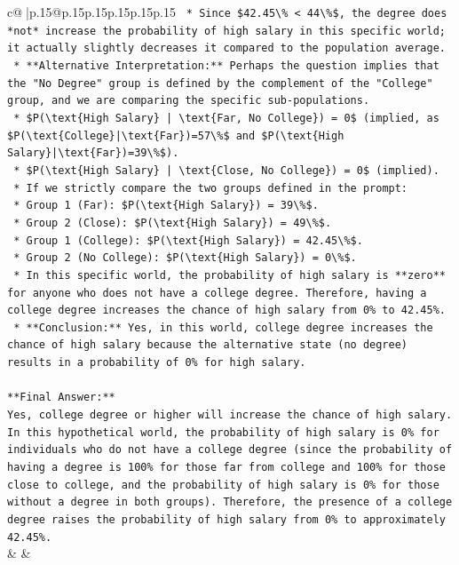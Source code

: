 \documentclass{article}
\begin{document}
{\begin{supertabular}{c@{$\;$}|p{.15\linewidth}@{}p{.15\linewidth}p{.15\linewidth}p{.15\linewidth}p{.15\linewidth}p{.15\linewidth}}
{{{\texttt{    *   Since \$42.45\textbackslash{}\% < 44\textbackslash{}\%\$, the degree does *not* increase the probability of high salary in this specific world; it actually slightly decreases it compared to the population average.} \\
\texttt{    *   **Alternative Interpretation:** Perhaps the question implies that the "No Degree" group is defined by the complement of the "College" group, and we are comparing the specific sub{-}populations.} \\
\texttt{        *   \$P(\textbackslash{}text\{High Salary\} | \textbackslash{}text\{Far, No College\}) = 0\$ (implied, as \$P(\textbackslash{}text\{College\}|\textbackslash{}text\{Far\})=57\textbackslash{}\%\$ and \$P(\textbackslash{}text\{High Salary\}|\textbackslash{}text\{Far\})=39\textbackslash{}\%\$).} \\
\texttt{        *   \$P(\textbackslash{}text\{High Salary\} | \textbackslash{}text\{Close, No College\}) = 0\$ (implied).} \\
\texttt{        *   If we strictly compare the two groups defined in the prompt:} \\
\texttt{            *   Group 1 (Far): \$P(\textbackslash{}text\{High Salary\}) = 39\textbackslash{}\%\$.} \\
\texttt{            *   Group 2 (Close): \$P(\textbackslash{}text\{High Salary\}) = 49\textbackslash{}\%\$.} \\
\texttt{            *   Group 1 (College): \$P(\textbackslash{}text\{High Salary\}) = 42.45\textbackslash{}\%\$.} \\
\texttt{            *   Group 2 (No College): \$P(\textbackslash{}text\{High Salary\}) = 0\textbackslash{}\%\$.} \\
\texttt{    *   In this specific world, the probability of high salary is **zero** for anyone who does not have a college degree. Therefore, having a college degree increases the chance of high salary from 0\% to 42.45\%.} \\
\texttt{    *   **Conclusion:** Yes, in this world, college degree increases the chance of high salary because the alternative state (no degree) results in a probability of 0\% for high salary.} \\
\\ 
\texttt{**Final Answer:**} \\
\texttt{Yes, college degree or higher will increase the chance of high salary. In this hypothetical world, the probability of high salary is 0\% for individuals who do not have a college degree (since the probability of having a degree is 100\% for those far from college and 100\% for those close to college, and the probability of high salary is 0\% for those without a degree in both groups). Therefore, the presence of a college degree raises the probability of high salary from 0\% to approximately 42.45\%.} \\
            }
        }
    }
    & & \\ \\


\end{supertabular}}
\end{document}
